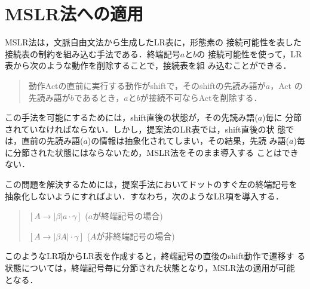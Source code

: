 \section{MSLR法への適用}
MSLR法\cite{tanaka1995}は，文脈自由文法から生成したLR表に，形態素の
接続可能性を表した接続表の制約を組み込む手法である．終端記号$a$と$b$の
接続可能性を使って，LR表から次のような動作を削除することで，接続表を組
み込むことができる．
\begin{quote}
  動作Actの直前に実行する動作がshiftで，そのshiftの先読み語が$a$，Act
  の先読み語が$b$であるとき，$a$と$b$が接続不可ならActを削除する．
\end{quote}

この手法を可能にするためには，shift直後の状態が，その先読み語($a$)毎に
分節されていなければならない．しかし，提案法のLR表では，shift直後の状
態では，直前の先読み語($a$)の情報は抽象化されてしまい，その結果，先読
み語($a$)毎に分節された状態にはならないため，MSLR法をそのまま導入する
ことはできない．

この問題を解決するためには，提案手法においてドットのすぐ左の終端記号を
抽象化しないようにすればよい．すなわち，次のようなLR項を導入する．
\begin{quote}
  $[ A \rightarrow |\beta| a \cdot \gamma ]$ ($a$が終端記号の場合)

  $[ A \rightarrow |\beta A| \cdot \gamma ]$ ($A$が非終端記号の場合)
\end{quote}
このようなLR項からLR表を作成すると，終端記号の直後のshift動作で遷移す
る状態については，終端記号毎に分節された状態となり，MSLR法の適用が可能
となる．


\begin{biography}


\end{biography}




